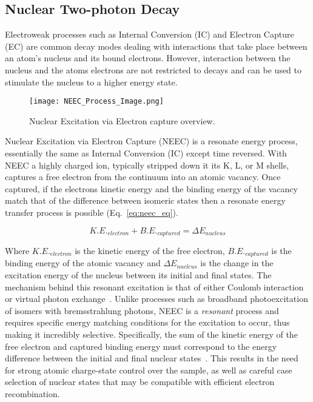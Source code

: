 \documentclass[cnatzke_thesis_proposal.tex]{subfiles}
\begin{document}
    \subsection{Nuclear Two-photon Decay}
    Electroweak processes such as Internal Conversion (IC) and Electron Capture (EC) are common decay modes dealing with interactions that take place between an atom's nucleus and its bound electrons.
    However, interaction between the nucleus and the atoms electrons are not restricted to decays and can be used to stimulate the nucleus to a higher energy state.

    \begin{figure}[H]
        \begin{center}
            \texttt{[image: NEEC\_Process\_Image.png]}
        \end{center}
        \caption{Nuclear Excitation via Electron capture overview. \cite{eec_SOP_NEEC}}
        \label{fig:neec_process}
    \end{figure}

    Nuclear Excitation via Electron Capture (NEEC) is a resonate energy process, essentially the same as Internal Conversion (IC) except time reversed.
    With NEEC a highly charged ion, typically stripped down it its K, L, or M shells, captures a free electron from the continuum into an atomic vacancy.
    Once captured, if the electrons kinetic energy and the binding energy of the vacancy match that of the difference between isomeric states then a resonate energy transfer process is possible (Eq.~\ref{eq:neec_eq}).

    \begin{equation}
        K.E._{electron} + B.E._{captured} = \Delta E_{nucleus}
        \label{eq:neec_eq}
    \end{equation}

    Where $K.E._{electron}$ is the kinetic energy of the free electron, $B.E._{captured}$ is the binding energy of the atomic vacancy and $\Delta E_{nucleus}$ is the change in the excitation energy of the nucleus between its initial and final states.
    The mechanism behind this resonant excitation is that of either Coulomb interaction or virtual photon exchange~\cite{PALFFY_2007}.
    Unlike processes such as broadband photoexcitation of isomers with bremsstrahlung photons, NEEC is a \textit{resonant} process and requires specific energy matching conditions for the excitation to occur, thus making it incredibly selective.
    Specifically, the sum of the kinetic energy of the free electron and captured binding energy must correspond to the energy difference between the initial and final nuclear states~\cite{PALFFY_2007}.
    This results in the need for strong atomic charge-state control over the sample, as well as careful case selection of nuclear states that may be compatible with efficient electron recombination.
\end{document}
